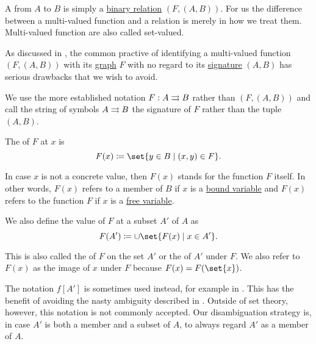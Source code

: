 \begin{definition}\label{def:multi_valued_function}
  A  from \( A \) to \( B \) is simply a \hyperref[def:binary_relation]{binary relation} \( (F, (A, B)) \). For us the difference between a multi-valued function and a relation is merely in how we treat them. Multi-valued function are also called set-valued.

  As discussed in , the common practive of identifying a multi-valued function \( (F, (A, B)) \) with its \hyperref[def:binary_relation/graph]{graph} \( F \) with no regard to its \hyperref[def:binary_relation/signature]{signature} \( (A, B) \) has serious drawbacks that we wish to avoid.

  We use the more established notation \( F: A \rightrightarrows B \) rather than \( (F, (A, B)) \) and call the string of symbols \( A \rightrightarrows B \) the signature of \( F \) rather than the tuple \( (A, B) \).

  \begin{thmenum}[series=def:multi_valued_function]
     The  of \( F \) at \( x \) is
    \begin{equation*}
      F(x) \coloneqq \set{ y \in B \given (x, y) \in F }.
    \end{equation*}

    In case \( x \) is not a concrete value, then \( F(x) \) stands for the function \( F \) itself. In other words, \( F(x) \) refers to a member of \( B \) if \( x \) is a \hyperref[def:first_order_syntax/formula_bound_variables]{bound variable} and \( F(x) \) refers to the function \( F \) if \( x \) is a \hyperref[def:first_order_syntax/formula_free_variables]{free variable}.

     We also define the value of \( F \) at a subset \( A' \) of \( A \) as
    \begin{equation*}
      F(A') \coloneqq \cup \set{ F(x) \given x \in A' }.
    \end{equation*}

    This is also called the  of \( F \) on the set \( A' \) or the  of \( A' \) under \( F \). We also refer to \( F(x) \) as the image of \( x \) under \( F \) because \( F(x) = F(\set{x}) \).

    The notation \( f[A'] \) is sometimes used instead, for example in \cite[def. 2.31]{OpenLogicFull}. This has the benefit of avoiding the nasty ambiguity described in . Outside of set theory, however, this notation is not commonly accepted. Our disambiguation strategy is, in case \( A' \) is both a member and a subset of \( A \), to always regard \( A' \) as a member of \( A \).
  \end{thmenum}


\end{definition}
